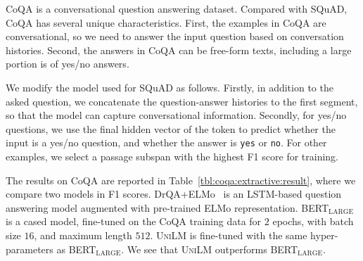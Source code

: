 \documentclass{article}
\newcommand\ours{\textsc{UniLM}}
\begin{document}


CoQA is a conversational question answering dataset.
Compared with SQuAD, CoQA has several unique characteristics. First, the examples in CoQA are conversational, so we need to answer the input question based on conversation histories. Second, the answers in CoQA can be free-form texts, including a large portion is of yes/no answers.

We modify the model used for SQuAD as follows.
Firstly, in addition to the asked question, we concatenate the question-answer histories to the first segment, so that the model can capture conversational information.
Secondly, for yes/no questions, we use the final hidden vector of the  token to predict whether the input is a yes/no question, and whether the answer is \texttt{yes} or \texttt{no}. For other examples, we select a passage subspan with the highest F1 score for training. 

The results on CoQA are reported in Table~\ref{tbl:coqa:extractive:result}, where we compare two models in F1 scores. 
DrQA+ELMo~\citep{coqa} is an LSTM-based question answering model augmented with pre-trained ELMo representation.
BERT$_{\text{LARGE}}$ is a cased model, fine-tuned on the CoQA training data for $2$ epochs, with batch size $16$, and maximum length $512$. \ours{} is fine-tuned with the same hyper-parameters as BERT$_{\text{LARGE}}$. 
We see that \ours{} outperforms BERT$_\text{LARGE}$.
\end{document}

